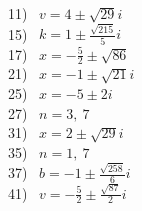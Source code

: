 \documentclass[12pt]{book}
\theoremstyle{definition}
\begin{document}

\begin{multicols}{3}
   11)~ $v=4\pm\sqrt{29}i$\\
   15)~ $k=1\pm\frac{\sqrt{215}}{5}i$\\
   17)~ $x=-\frac{5}{2}\pm\sqrt{86}$\\
   21)~ $x=-1\pm\sqrt{21}i$\\
   25)~ $x=-5\pm 2i$\\
   27)~ $n=3,~7$\\
   31)~ $x=2\pm\sqrt{29}i$\\
   35)~ $n=1,~7$\\
   37)~ $b=-1\pm\frac{\sqrt{258}}{6}i$\\
   41)~ $v=-\frac{5}{2}\pm\frac{\sqrt{87}}{2}i$\\

\end{multicols}
\end{document}
